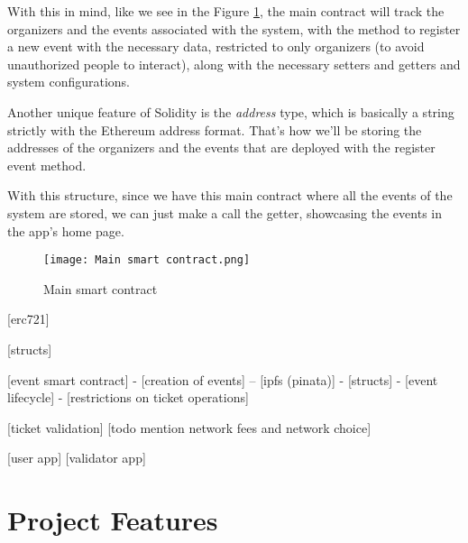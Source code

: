 With this in mind, like we see in the Figure \ref{fig:main_smart_contract}, the main contract will track the organizers and the events associated with the system, with the method to register a new event with the necessary data, restricted to only organizers (to avoid unauthorized people to interact), along with the necessary setters and getters and system configurations.

Another unique feature of Solidity is the \textit{address} type, which is basically a string strictly with the Ethereum address format. That's how we'll be storing the addresses of the organizers and the events that are deployed with the register event method.

With this structure, since we have this main contract where all the events of the system are stored, we can just make a call the getter, showcasing the events in the app's home page.

\begin{figure}[H]
    \texttt{[image: Main smart contract.png]}
    \centering
    \caption{Main smart contract}
    \label{fig:main_smart_contract}
\end{figure}


[erc721]

[structs]

[event smart contract]
- [creation of events]
-- [ipfs (pinata)]
- [structs]
- [event lifecycle]
- [restrictions on ticket operations]

[ticket validation]
[todo mention network fees and network choice]

[user app]
[validator app]

\section{Project Features}
